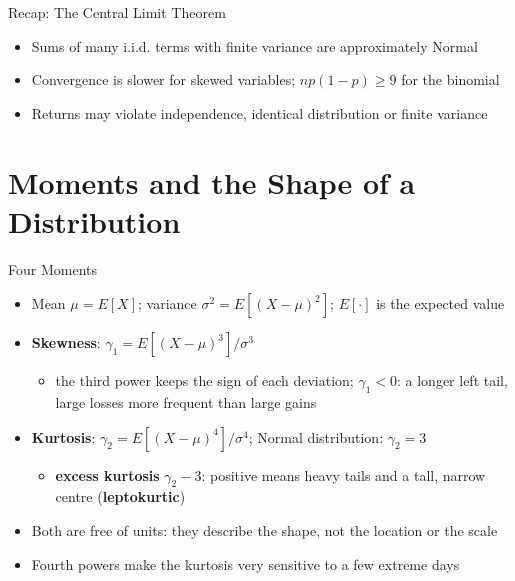 \begin{frame}{Recap: The Central Limit Theorem}
\itemsize{\small}
\begin{itemize}
    \item Sums of many i.i.d. terms with finite variance are approximately Normal
    \item Convergence is slower for skewed variables; $np(1-p) \ge 9$ for the binomial
    \item Returns may violate independence, identical distribution or finite variance
\end{itemize}
\end{frame}


\section{Moments and the Shape of a Distribution}

\begin{frame}{Four Moments}
\itemsize{\small}
\begin{itemize}
    \item Mean $\mu = E[X]$; variance $\sigma^2 = E[(X - \mu)^2]$; $E[\cdot]$ is the expected value
    \item \textbf{Skewness}: $\gamma_1 = E[(X - \mu)^3]/\sigma^3$
    \begin{itemize}
        \item the third power keeps the sign of each deviation; $\gamma_1 < 0$: a longer left tail, large losses more frequent than large gains
    \end{itemize}
    \item \textbf{Kurtosis}: $\gamma_2 = E[(X - \mu)^4]/\sigma^4$; Normal distribution: $\gamma_2 = 3$
    \begin{itemize}
        \item \textbf{excess kurtosis} $\gamma_2 - 3$: positive means heavy tails and a tall, narrow centre (\textbf{leptokurtic})
    \end{itemize}
    \item Both are free of units: they describe the shape, not the location or the scale
    \item Fourth powers make the kurtosis very sensitive to a few extreme days
\end{itemize}
\end{frame}

